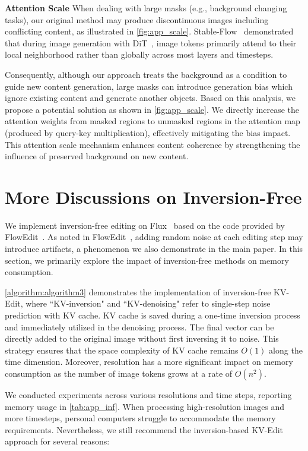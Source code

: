 \noindent\textbf{Attention Scale}
When dealing with large masks (e.g., background changing tasks), our original method may produce discontinuous images including conflicting content, as illustrated in \cref{fig:app_scale}. Stable-Flow~\cite{avrahami2024stable} demonstrated that during image generation with DiT~\cite{peebles2023scalable}, image tokens primarily attend to their local neighborhood rather than globally across most layers and timesteps.

Consequently, although our approach treats the background as a condition to guide new content generation, large masks can introduce generation bias which ignore existing content and generate another objects. Based on this analysis, we propose a potential solution as shown in \cref{fig:app_scale}. We directly increase the attention weights from masked regions to unmasked regions in the attention map (produced by query-key multiplication), effectively mitigating the bias impact. This attention scale mechanism enhances content coherence by strengthening the influence of preserved background on new content.



\section{More Discussions on Inversion-Free}
\label{app:B}
We implement inversion-free editing on Flux~\cite{flux} based on the code provided by FlowEdit~\cite{kulikov2024flowedit}. As noted in FlowEdit~\cite{kulikov2024flowedit}, adding random noise at each editing step may introduce artifacts, a phenomenon we also demonstrate in the main paper. In this section, we primarily explore the impact of inversion-free methods on memory consumption.

\cref{algorithm:algorithm3} demonstrates the implementation of inversion-free KV-Edit, where ``KV-inversion" and ``KV-denoising" refer to single-step noise prediction with KV cache. KV cache is saved during a one-time inversion process and immediately utilized in the denoising process. The final vector can be directly added to the original image without first inversing it to noise. This strategy ensures that the space complexity of KV cache remains $O(1)$ along the time dimension. Moreover, resolution has a more significant impact on memory consumption as the number of image tokens grows at a rate of $O(n^2)$.

We conducted experiments across various resolutions and time steps, reporting memory usage in \cref{tab:app_inf}. When processing high-resolution images and more timesteps, personal computers struggle to accommodate the memory requirements. Nevertheless, we still recommend the inversion-based KV-Edit approach for several reasons:

